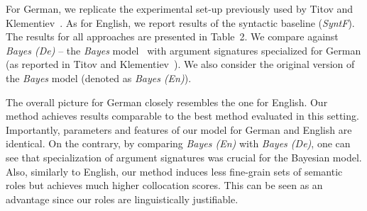 For German, we replicate the experimental set-up previously
used by Titov and Klementiev~\citet{TitovAcl2012}. As for English,
we report results of the syntactic baseline ({\em SyntF}).  
The results for all approaches are presented in Table~2.
We compare against {\em Bayes (De)} -- the {\em Bayes} model~
with argument signatures specialized for German (as reported in Titov and
Klementiev~\citet{TitovAcl2012}).
We also consider the original version of the {\em Bayes} model (denoted as {\em Bayes (En)}). 

The overall picture for German closely resembles the one for English. Our method achieves results comparable to
the best method evaluated in this setting. 
Importantly, parameters and features of our model for German and English are identical. 
On the contrary, by comparing  {\em Bayes (En)} with {\em Bayes (De)},  one can see that specialization of argument
signatures was crucial for the Bayesian model.  Also, similarly to English, our method induces less fine-grain sets of semantic roles but achieves
much higher collocation scores. This can be seen as an advantage since our roles
are linguistically justifiable.
